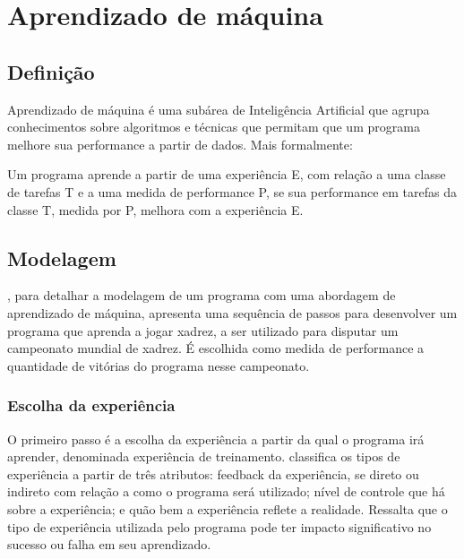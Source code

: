 \chapter{Aprendizado de máquina}

\section{Definição}

Aprendizado de máquina é uma subárea de Inteligência Artificial que agrupa conhecimentos sobre algoritmos e técnicas que permitam que um programa melhore sua performance a partir de dados. Mais formalmente:

\begin{citacao}
Um programa aprende a partir de uma experiência E, com relação a uma classe de tarefas T e a uma medida de performance P, se sua performance em tarefas da classe T, medida por P, melhora com a experiência E. \cite[p.2, tradução nossa]{Tom_mitchell}
\end{citacao}

\section{Modelagem}

\cite{Tom_mitchell}, para detalhar a modelagem de um programa com uma abordagem de aprendizado de máquina, apresenta uma sequência de passos para desenvolver um programa que aprenda a jogar xadrez, a ser utilizado para disputar um campeonato mundial de xadrez. É escolhida como medida de performance a quantidade de vitórias do programa nesse campeonato.

\subsection*{Escolha da experiência}

O primeiro passo é a escolha da experiência a partir da qual o programa irá aprender, denominada experiência de treinamento. \cite{Tom_mitchell} classifica os tipos de experiência a partir de três atributos: feedback da experiência, se direto ou indireto com relação a como o programa será utilizado; nível de controle que há sobre a experiência; e quão bem a experiência reflete a realidade. Ressalta que o tipo de experiência utilizada pelo programa pode ter impacto significativo no sucesso ou falha em seu aprendizado. 

